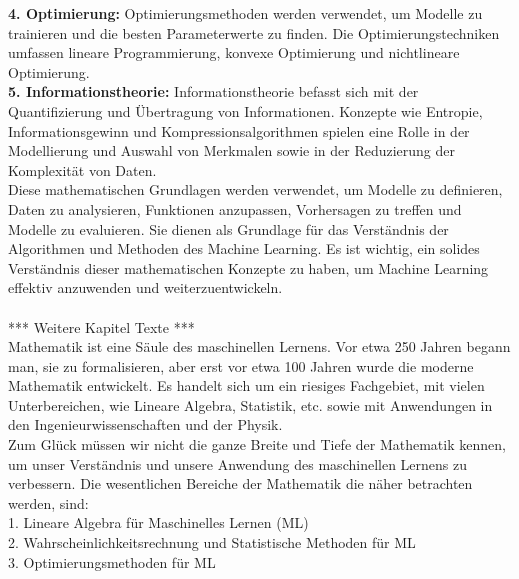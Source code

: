 \documentclass[12pt]{article}
\begin{document}
%
\textbf{4. Optimierung:} Optimierungsmethoden werden verwendet, um Modelle zu trainieren und die besten Parameterwerte zu finden. Die Optimierungstechniken umfassen lineare Programmierung, konvexe Optimierung und nichtlineare Optimierung.\\[0.2cm]
%
\textbf{5. Informationstheorie:} Informationstheorie befasst sich mit der Quantifizierung und Übertragung von Informationen. Konzepte wie Entropie, Informationsgewinn und Kompressionsalgorithmen spielen eine Rolle in der Modellierung und Auswahl von Merkmalen sowie in der Reduzierung der Komplexität von Daten.\\[0.2cm]
%
Diese mathematischen Grundlagen werden verwendet, um Modelle zu definieren, Daten zu analysieren, Funktionen anzupassen, Vorhersagen zu treffen und Modelle zu evaluieren. Sie dienen als Grundlage für das Verständnis der Algorithmen und Methoden des Machine Learning. Es ist wichtig, ein solides Verständnis dieser mathematischen Konzepte zu haben, um Machine Learning effektiv anzuwenden und weiterzuentwickeln.\\
%
\\ *** Weitere Kapitel Texte *** \\[0.2cm]
%
Mathematik ist eine Säule des maschinellen Lernens. Vor etwa 250 Jahren begann man, sie zu formalisieren, aber erst vor etwa 100 Jahren wurde die moderne Mathematik entwickelt. Es handelt sich um ein riesiges Fachgebiet, mit vielen Unterbereichen, wie Lineare Algebra, Statistik, etc. sowie mit Anwendungen in den Ingenieurwissenschaften und der Physik.\\
Zum Glück müssen wir nicht die ganze Breite und Tiefe der Mathematik kennen, um unser Verständnis und unsere Anwendung des maschinellen Lernens zu verbessern. Die wesentlichen Bereiche der Mathematik die näher betrachten werden, sind:\\

1.	Lineare Algebra für Maschinelles Lernen (ML)\\ 

2.	Wahrscheinlichkeitsrechnung und Statistische Methoden für ML\\ 

3.	Optimierungsmethoden für ML\\
\end{document}
